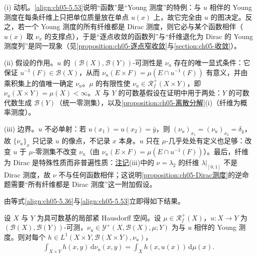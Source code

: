 \documentclass[../../main.tex]{subfiles}%
\begin{document}
\begin{remark}\label{remark:ch05-Dirac测度动机}
(i) 动机。\eqref{align:ch05-5.53}说明“函数”是“Young 测度”的特例：与 $u$ 相伴的 Young 测度在每条纤维上只把单位质量放在单点 $u(x)$ 上，故它完全由 $u$ 的图决定。反之，若一个 Young 测度的所有纤维都是 Dirac 测度，则它必与某个函数相伴（$u(x)$ 取 $\nu_x$ 的支撑点），于是“逐点收敛的函数列”与“纤维退化为 Dirac 的 Young 测度列”是同一现象（见\cref{proposition:ch05-逐点窄收敛}与\cref{section:ch05-收敛}）。

(ii) 假设的作用。$u$ 的 $(\mathscr{B}(X),\mathscr{B}(Y))$-可测性是 $\nu_u$ 存在的唯一显式条件：它保证 $u^{-1}(F)\in\mathscr{B}(X)$，从而 $\nu_u(E\times F)=\mu(E\cap u^{-1}(F))$ 有意义，并由乘积集上的值唯一确定 $\nu_u$。$\mu$ 的有限性使 $\nu_u\in\mathscr{R}^+_f(X\times Y)$，即 $\nu_u(X\times Y)=\mu(X)<\infty$。$X$ 与 $Y$ 的可数基假设在证明中用于两处：$Y$ 的可数代数生成 $\mathscr{B}(Y)$（统一零测集），以及\cref{proposition:ch05-离散分解}(i)（纤维为概率测度）。

(iii) 边界。$u$ 不必单射：若 $u(x_1)=u(x_2)=\bar{y}$，则 $(\nu_u)_{x_1}=(\nu_u)_{x_2}=\delta_{\bar{y}}$，故 $\{\nu_u\}_x$ 只记录 $u$ 的像点，不记录 $x$ 本身。$u$ 只在 $\mu$-几乎处处有定义也足够：改变 $u$ 于 $\mu$-零测集不改变 $\nu_u$（由 $\nu_u(E\times F)=\mu(E\cap u^{-1}(F))$）。最后，纤维为 Dirac 是特殊性质而非普遍性质：\hyperref[remark:ch05-Young离散分解动机]{注记}(iii)中的 $\nu=\lambda_2$ 的纤维 $\lambda|_{[0,1]}$ 不是 Dirac 测度，故 $\nu$ 不与任何函数相伴；这说明\cref{proposition:ch05-Dirac测度}的逆命题需要“所有纤维都是 Dirac 测度”这一附加假设。
\end{remark}

由等式\eqref{align:ch05-5.36}与\eqref{align:ch05-5.53}立即得如下结果。

\begin{corollary}\label{corollary:ch05-Young积分}
设 $X$ 与 $Y$ 为具可数基的局部紧 Hausdorff 空间。设 $\mu\in\mathscr{R}^+_f(X)$，$u:X\to Y$ 为 $(\mathscr{B}(X),\mathscr{B}(Y))$-可测，$\nu_u\in\mathcal{Y}^+(X,\mathscr{B}(X),\mu;Y)$ 为与 $u$ 相伴的 Young 测度。则对每个 $h\in L^1(X\times Y,\mathscr{B}(X\times Y),\nu_u)$，
\begin{align}
\int_{X\times Y}h(x,y)\,\mathrm{d}\nu_u(x,y)
=\int_X h(x,u(x))\,\mathrm{d}\mu(x).\label{align:ch05-5.54}
\end{align}
\end{corollary}
\end{document}
